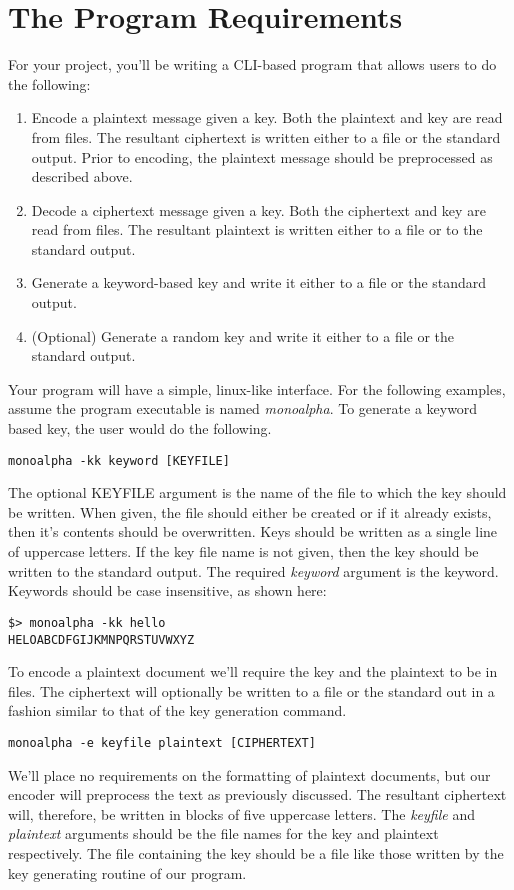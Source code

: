 \documentclass[]{tufte-handout}
\begin{document}
\section{The Program Requirements}

For your project, you'll be writing a CLI-based program that allows users to do the following:
\begin{enumerate}
\item Encode a plaintext message given a key. Both the plaintext and key are read from files. The resultant ciphertext is written either to a file or the standard output. Prior to encoding, the plaintext message should be preprocessed as described above.
\item Decode a ciphertext message given a key. Both the ciphertext and key are read from files. The resultant plaintext is written either to a file or to the standard output.
\item Generate a keyword-based key and write it either to a file or the standard output.
\item (Optional) Generate a random key and write it either to a file or the standard output.  
\end{enumerate}

Your program will have a simple, linux-like interface. For the following examples, assume the program executable is named \textit{monoalpha}. To generate a keyword based key, the user would do the following.
\begin{verbatim}
monoalpha -kk keyword [KEYFILE]
\end{verbatim}
The optional KEYFILE argument is the name of the file to which the key should be written.  When given, the file should either be created or if it already exists, then it's contents should be overwritten. Keys should be written as a single line of uppercase letters. If the key file name is not given, then the key should be written to the standard output. The required \textit{keyword} argument is the keyword. Keywords should be case insensitive, as shown here:
\begin{verbatim}
$> monoalpha -kk hello
HELOABCDFGIJKMNPQRSTUVWXYZ
\end{verbatim}
To encode a plaintext document we'll require the key and the plaintext to be in files.  The ciphertext will optionally be written to a file or the standard out in a fashion similar to that of the key generation command.
\begin{verbatim}
monoalpha -e keyfile plaintext [CIPHERTEXT]
\end{verbatim}
We'll place no requirements on the formatting of plaintext documents, but our encoder will preprocess the text as previously discussed. The resultant ciphertext will, therefore, be written in blocks of five uppercase letters. The \textit{keyfile} and \textit{plaintext} arguments should be the file names for the key and plaintext respectively. The file containing the key should be a file like those written by the key generating routine of our program.
\end{document}
